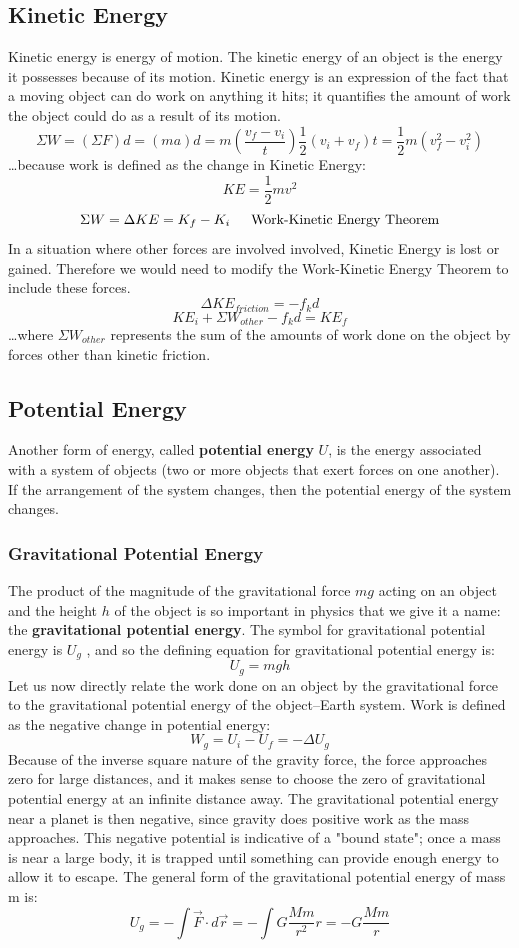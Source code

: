 \documentclass{article}
\begin{document}
\subsection{Kinetic Energy}
Kinetic energy is energy of motion. The kinetic energy of an object is the energy it possesses because of its motion. Kinetic energy is an expression of the fact that a moving object can do work on anything it hits; it quantifies the amount of work the object could do as a result of its motion.
\[
\Sigma W=(\Sigma F)d=(ma)d=m(\frac{v_f-v_i}{t})\frac{1}{2}(v_i+v_f)t=\frac{1}{2}m(v_f^2-v_i^2)
\]
\ldots because work is defined as the change in Kinetic Energy:
\[
KE=\frac{1}{2}mv^2
\]
\[
\Sigma W=\Delta KE=K_f-K_i \indent
\text{Work-Kinetic Energy Theorem}
\]
In a situation where other forces are involved involved, Kinetic Energy is lost or gained. Therefore we would need to modify the Work-Kinetic Energy Theorem to include these forces.
\[
\Delta KE_{friction}=-f_kd
\]
\[
KE_i+\Sigma W_{other}-f_kd=KE_f
\]
\ldots where $\Sigma W_{other}$ represents the sum of the amounts of work done on the object by
forces other than kinetic friction.
\subsection{Potential Energy}
Another form of energy, called \textbf{potential energy} $U$, is the energy associated with a system of objects (two or more objects that exert forces on one another). If the arrangement of the system changes, then the potential energy of the system changes.
\subsubsection{Gravitational Potential Energy}
The product of the magnitude of the gravitational force $mg$ acting on an object and the height $h$ of the object is so important in physics that we give it a name: the \textbf{gravitational potential energy}. The symbol for gravitational potential energy is $U_g$ , and so the defining equation for gravitational potential energy is:
\[
U_g=mgh
\]
Let us now directly relate the work done on an object by the gravitational force to the gravitational potential energy of the object–Earth system. Work is defined as the negative change in potential energy:
\[
W_g=U_i-U_f=-\Delta U_g
\]
Because of the inverse square nature of the gravity force, the force approaches zero for large distances, and it makes sense to choose the zero of gravitational potential energy at an infinite distance away. The gravitational potential energy near a planet is then negative, since gravity does positive work as the mass approaches. This negative potential is indicative of a "bound state"; once a mass is near a large body, it is trapped until something can provide enough energy to allow it to escape. The general form of the gravitational potential energy of mass m is:
\[
U_g=-\int \vec{F}\cdot d\vec{r}=-\int G\frac{Mm}{r^2}r=-G\frac{Mm}{r}
\]
\end{document}
